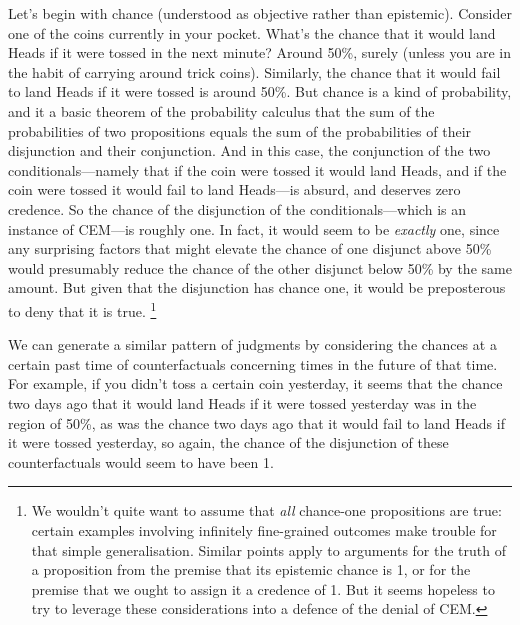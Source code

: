 \documentclass[If.tex]{subfiles}
\begin{document}
Let's begin with chance (understood as objective rather than epistemic). Consider one of the coins currently in your pocket. What's the chance that it would land Heads if it were tossed in the next minute? Around 50\%, surely (unless you are in the habit of carrying around trick coins). Similarly, the chance that it would fail to land Heads if it were tossed is around 50\%. But chance is a kind of probability, and it a basic theorem of the probability calculus that the sum of the probabilities of two propositions equals the sum of the probabilities of their disjunction and their conjunction. And in this case, the conjunction of the two conditionals---namely that if the coin were tossed it would land Heads, and if the coin were tossed it would fail to land Heads---is absurd, and deserves zero credence. So the chance of the disjunction of the conditionals---which is an instance of CEM---is roughly one. In fact, it would seem to be \emph{exactly} one, since any surprising factors that might elevate the chance of one disjunct above 50\% would presumably reduce the chance of the other disjunct below 50\% by the same amount. But given that the disjunction has chance one, it would be preposterous to deny that it is true.%
\footnote{We wouldn't quite want to assume that \emph{all} chance-one propositions are true: certain examples involving infinitely fine-grained outcomes make trouble for that simple generalisation. Similar points apply to arguments for the truth of a proposition from the premise that its epistemic chance is 1, or for the premise that we ought to assign it a credence of 1. But it seems hopeless to try to leverage these considerations into a defence of the denial of CEM.}



	We can generate a similar pattern of judgments by considering the chances at a certain past time of counterfactuals concerning times in the future of that time. For example, if you didn't toss a certain coin yesterday, it seems that the chance two days ago that it would land Heads if it were tossed yesterday was in the region of 50\%, as was the chance two days ago that it would fail to land Heads if it were tossed yesterday, so again, the chance of the disjunction of these counterfactuals would seem to have been 1.
\end{document}
